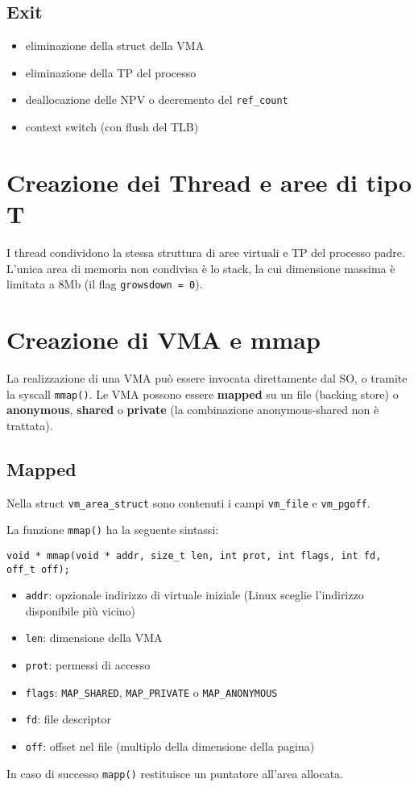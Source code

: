 \documentclass[12pt, a4paper]{report}
\begin{document}
\subsection{Exit}
\begin{itemize}
	\item eliminazione della struct della VMA
	\item eliminazione della TP del processo
	\item deallocazione delle NPV o decremento del \texttt{ref\_count}
	\item context switch (con flush del TLB)
\end{itemize}

\section{Creazione dei Thread e aree di tipo T}
I thread condividono la stessa struttura di aree virtuali e TP del processo
padre. L'unica area di memoria non condivisa è lo stack, la cui dimensione
massima è limitata a 8Mb (il flag \texttt{growsdown = 0}).

\section{Creazione di VMA e mmap}
La realizzazione di una VMA può essere invocata direttamente dal SO, o tramite
la syscall \texttt{mmap()}. Le VMA possono essere \textbf{mapped} su un file
(backing store) o \textbf{anonymous}, \textbf{shared} o \textbf{private} (la
combinazione anonymous-shared non è trattata).
\subsection{Mapped}
Nella struct \texttt{vm\_area\_struct} sono contenuti i campi \texttt{vm\_file}
e \texttt{vm\_pgoff}.

La funzione \texttt{mmap()} ha la seguente sintassi:
\begin{verbatim}
void * mmap(void * addr, size_t len, int prot, int flags, int fd, off_t off);
\end{verbatim}
\begin{itemize}
	\item \texttt{addr}: opzionale indirizzo di virtuale iniziale (Linux sceglie
		l'indirizzo disponibile più vicino)
	\item \texttt{len}: dimensione della VMA
	\item \texttt{prot}: permessi di accesso
	\item \texttt{flags}: \texttt{MAP\_SHARED}, \texttt{MAP\_PRIVATE} o
		\texttt{MAP\_ANONYMOUS}
	\item \texttt{fd}: file descriptor
	\item \texttt{off}: offset nel file (multiplo della dimensione della pagina)
\end{itemize}
In caso di successo \texttt{mapp()} restituisce un puntatore all'area allocata.
\end{document}
